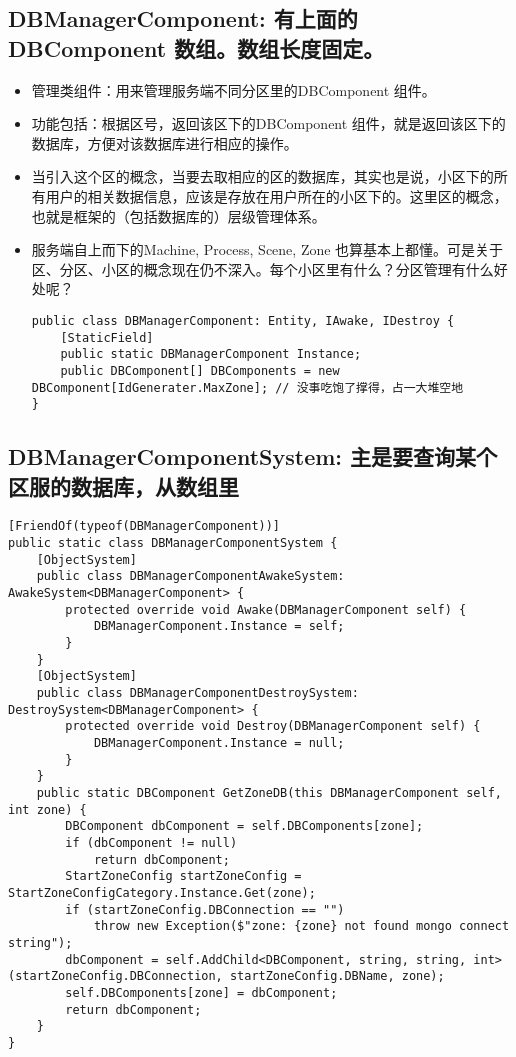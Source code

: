 \documentclass[9pt, b5paper]{article}
\begin{document}
\subsection{DBManagerComponent: 有上面的 DBComponent 数组。数组长度固定。}
\label{sec-4-4}
\begin{itemize}
\item 管理类组件：用来管理服务端不同分区里的DBComponent 组件。
\item 功能包括：根据区号，返回该区下的DBComponent 组件，就是返回该区下的数据库，方便对该数据库进行相应的操作。
\item 当引入这个区的概念，当要去取相应的区的数据库，其实也是说，小区下的所有用户的相关数据信息，应该是存放在用户所在的小区下的。这里区的概念，也就是框架的（包括数据库的）层级管理体系。
\item 服务端自上而下的Machine, Process, Scene, Zone 也算基本上都懂。可是关于区、分区、小区的概念现在仍不深入。每个小区里有什么？分区管理有什么好处呢？  
\begin{verbatim}
public class DBManagerComponent: Entity, IAwake, IDestroy {
    [StaticField]
    public static DBManagerComponent Instance;
    public DBComponent[] DBComponents = new DBComponent[IdGenerater.MaxZone]; // 没事吃饱了撑得，占一大堆空地
}
\end{verbatim}
\end{itemize}
\subsection{DBManagerComponentSystem: 主是要查询某个区服的数据库，从数组里}
\label{sec-4-5}
\begin{verbatim}
[FriendOf(typeof(DBManagerComponent))]
public static class DBManagerComponentSystem {
    [ObjectSystem]
    public class DBManagerComponentAwakeSystem: AwakeSystem<DBManagerComponent> {
        protected override void Awake(DBManagerComponent self) {
            DBManagerComponent.Instance = self;
        }
    }
    [ObjectSystem]
    public class DBManagerComponentDestroySystem: DestroySystem<DBManagerComponent> {
        protected override void Destroy(DBManagerComponent self) {
            DBManagerComponent.Instance = null;
        }
    }
    public static DBComponent GetZoneDB(this DBManagerComponent self, int zone) {
        DBComponent dbComponent = self.DBComponents[zone];
        if (dbComponent != null) 
            return dbComponent;
        StartZoneConfig startZoneConfig = StartZoneConfigCategory.Instance.Get(zone);
        if (startZoneConfig.DBConnection == "") 
            throw new Exception($"zone: {zone} not found mongo connect string");
        dbComponent = self.AddChild<DBComponent, string, string, int>(startZoneConfig.DBConnection, startZoneConfig.DBName, zone);
        self.DBComponents[zone] = dbComponent;
        return dbComponent;
    }
}
\end{verbatim}
\end{document}
